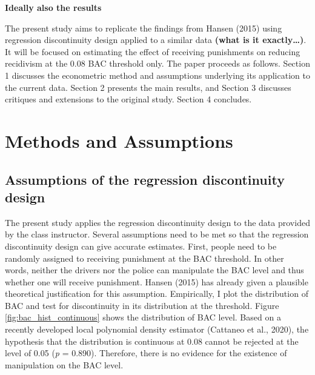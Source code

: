 \documentclass[
  11pt,
]{article}
\begin{document}
\textbf{Ideally also the results}

The present study aims to replicate the findings from Hansen (2015)
using regression discontinuity design applied to a similar data
\textbf{(what is it exactly\ldots)}. It will be focused on estimating
the effect of receiving punishments on reducing recidivism at the 0.08
BAC threshold only. The paper proceeds as follows. Section 1 discusses
the econometric method and assumptions underlying its application to the
current data. Section 2 presents the main results, and Section 3
discusses critiques and extensions to the original study. Section 4
concludes.

\hypertarget{methods-and-assumptions}{%
\section{Methods and Assumptions}\label{methods-and-assumptions}}

\hypertarget{assumptions-of-the-regression-discontinuity-design}{%
\subsection{Assumptions of the regression discontinuity
design}\label{assumptions-of-the-regression-discontinuity-design}}

The present study applies the regression discontinuity design to the
data provided by the class instructor. Several assumptions need to be
met so that the regression discontinuity design can give accurate
estimates. First, people need to be randomly assigned to receiving
punishment at the BAC threshold. In other words, neither the drivers nor
the police can manipulate the BAC level and thus whether one will
receive punishment. Hansen (2015) has already given a plausible
theoretical justification for this assumption. Empirically, I plot the
distribution of BAC and test for discontinuity in its distribution at
the threshold. Figure \ref{fig:bac_hist_continuous} shows the
distribution of BAC level. Based on a recently developed local
polynomial density estimator (Cattaneo et al., 2020), the hypothesis
that the distribution is continuous at 0.08 cannot be rejected at the
level of 0.05 (\emph{p} = 0.890). Therefore, there is no evidence for
the existence of manipulation on the BAC level.
\end{document}
